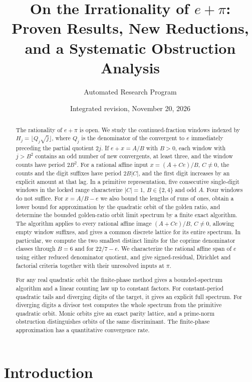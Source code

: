 \documentclass[11pt]{amsart}
\title[On the Irrationality of $e+\pi$]{On the Irrationality of $e+\pi$: Proven Results, New Reductions, and a Systematic Obstruction Analysis}
\author{Automated Research Program}
\date{Integrated revision, November 20, 2026}
\theoremstyle{definition}
\theoremstyle{remark}
\numberwithin{equation}{section}
\begin{document}
\begin{abstract}
The rationality of $e+\pi$ is open. We study the continued-fraction
windows indexed by $H_j=\lfloor Q_j\sqrt j\rfloor$, where $Q_j$ is the
denominator of the convergent to $e$ immediately preceding the partial
quotient $2j$. If $e+x=A/B$ with $B>0$, each window with $j>B^2$
contains an odd number of new convergents, at least three, and the
window counts have period $2B^2$. For a rational affine input
$x=(A+Ce)/B$, $C\ne0$, the counts and the digit suffixes have period
$2B|C|$, and the first digit increases by an explicit amount at that lag.
In a primitive representation, five consecutive single-digit windows
in the locked range characterize $|C|=1$, $B\in\{2,4\}$ and odd $A$.
Four windows do not suffice. For $x=A/B-e$ we also bound the lengths
of runs of ones, obtain a lower bound for approximation by the
quadratic orbit of the golden ratio, and determine the bounded golden-ratio orbit limit spectrum by a finite
exact algorithm. The algorithm applies to every rational affine image
$(A+Ce)/B$, $C\ne0$, allowing empty window suffixes, and gives a common
discrete lattice for its entire spectrum. In particular, we compute the two smallest distinct
limits for the coprime denominator classes through $B=6$ and for $22/7-e$.
We characterize the rational affine span of $e$ using
either reduced denominator quotient, and give signed-residual,
Dirichlet and factorial criteria together with their unresolved inputs
at $\pi$.

For any real quadratic orbit the finite-phase method gives a
bounded-spectrum algorithm and a linear counting law up to
constant factors. For constant-period quadratic tails and diverging
digits of the target, it gives an explicit full spectrum.
For diverging digits a divisor test computes the whole spectrum
from the primitive quadratic orbit. Monic orbits give an exact
parity lattice, and a prime-norm obstruction distinguishes
orbits of the same discriminant. The finite-phase approximation
has a quantitative convergence rate.
\end{abstract}

\maketitle

\section{Introduction}\label{sec:intro}
\end{document}

